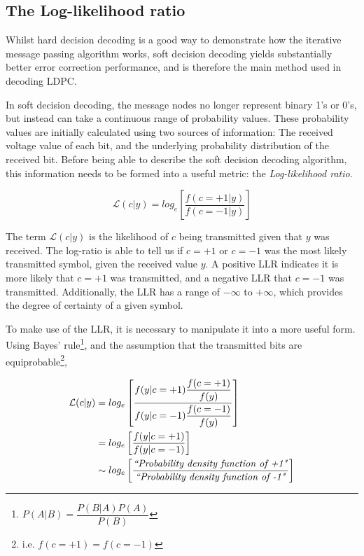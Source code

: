 \documentclass[11pt]{article}
\numberwithin{equation}{subsection}
\begin{document}
\subsection{The Log-likelihood ratio} \label{section:LLR}
Whilst hard decision decoding is a good way to demonstrate how the iterative message passing algorithm works, soft decision decoding yields substantially better error correction performance, and is therefore the main method used in decoding LDPC.

In soft decision decoding, the message nodes no longer represent binary 1's or 0's, but instead can take a continuous range of probability values. These probability values are initially calculated using two sources of information: The received voltage value of each bit, and the underlying probability distribution of the received bit. Before being able to describe the soft decision decoding algorithm, this information needs to be formed into a useful metric: the \textit{Log-likelihood ratio}.

\begin{equation} \label{eq:LLR}
\mathcal{L}(c|y) = log_e \left[ \dfrac{f(c=+1|y)}{f(c=-1|y)} \right]
\end{equation}

\noindent The term $\mathcal{L}(c|y)$ \cite{cho2012analysis} is the likelihood of $c$ being transmitted given that $y$ was received. The log-ratio is able to tell us if $c=+1$ or $c=-1$ was the most likely transmitted symbol, given the received value $y$. A positive LLR indicates it is more likely that $c=+1$ was transmitted, and a negative LLR that $c=-1$ was transmitted. Additionally, the LLR has a range of $-\infty$ to $+\infty$, which provides the degree of certainty of a given symbol.

To make use of the LLR, it is necessary to manipulate it into a more useful form. Using Bayes' rule\footnote{$P(A|B) = \dfrac{P(B|A) P(A)}{P(B)}$}, and the assumption that the transmitted bits are equiprobable\footnote{i.e. $f(c=+1) = f(c=-1)$},

\begin{equation}
\begin{aligned}
\mathcal{L}(c|y) &= log_e \left[ \dfrac{f(y|c=+1) \dfrac{f(c=+1)}{f(y)}}{f(y|c=-1) \dfrac{f(c=-1)}{f(y)}} \right] 
\\
&= log_e \left[ \dfrac{f(y|c=+1)} {f(y|c=-1)} \right] 
\\
&\sim log_e \left[ \dfrac{\text{\textit{``Probability density function of +1"}}}{\text{\textit{``Probability density function of -1"}}} \right]
\end{aligned}
\end{equation}
\end{document}
